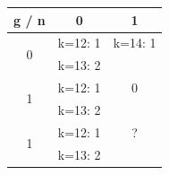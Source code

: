 \documentclass{article}
\begin{document}
\begin{center}
\begin{tabular}{ |c|c|c| } 
\hline
g / n & 0 & 1 \\
\hline
\multirow{2}{4em}{0} 
& k=12: 1 & k=14: 1 \\ 
& k=13: 2 &  \\ 
\hline
\multirow{2}{4em}{1} 
& k=12: 1 & 0 \\ 
& k=13: 2 &  \\ 
\hline
\multirow{2}{4em}{1} 
& k=12: 1 & ? \\ 
& k=13: 2 &  \\ 
\hline
\end{tabular}
\end{center}
\end{document}
